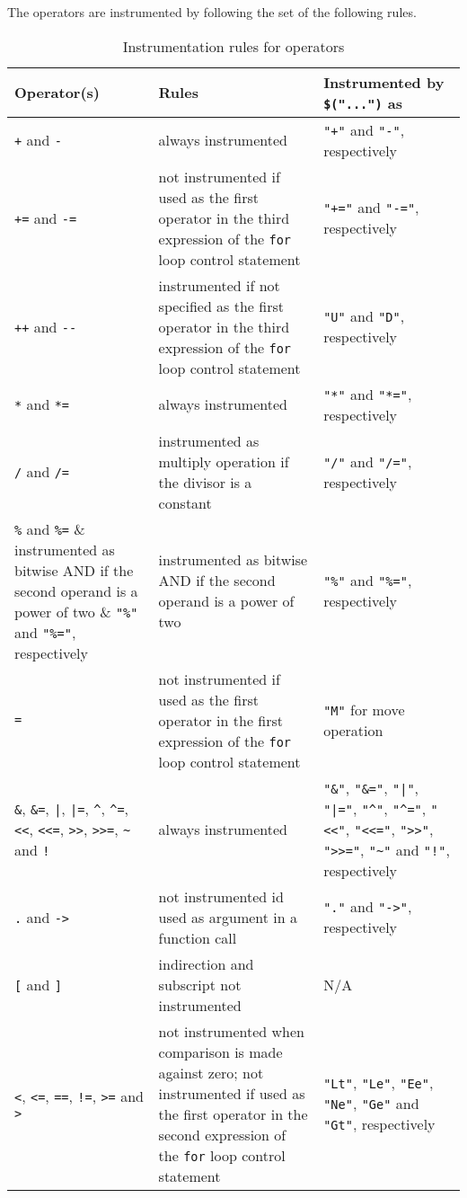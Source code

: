 The operators are instrumented by following the set of the following rules.

\begin{table}[!hb]
\centering\small
\caption{Instrumentation rules for operators}
\begin{tabular}{|p{}<{\raggedright}|p{}<{\raggedright}|p{}<{\raggedright}|}
\hline
\textbf{Operator(s)} & \textbf{Rules} & \textbf{Instrumented by} \verb|$("...")| \textbf{as} \\
\hline
\verb|+| and \verb|-| & always instrumented & \verb|"+"| and \verb|"-"|, respectively \\
\hline
\verb|+=| and \verb|-=| & not instrumented if used as the first operator in the third expression of the \verb|for| loop control statement & \verb|"+="| and \verb|"-="|, respectively \\
\hline
\verb|++| and \verb|--| & instrumented if not specified as the first operator in the third expression of the \verb|for| loop control statement & \verb|"U"| and \verb|"D"|, respectively \\
\hline
\verb|*| and \verb|*=| & always instrumented & \verb|"*"| and \verb|"*="|, respectively \\
\hline
\verb|/| and \verb|/=| & instrumented as multiply operation if the divisor is a constant & \verb|"/"| and \verb|"/="|, respectively \\
\hline
\verb|%| and \verb|%=| & instrumented as bitwise AND if the second operand is a power of two & \verb|"%"| and \verb|"%="|, respectively \\
\hline
\verb|=| & not instrumented if used as the first operator in the first expression of the \verb|for| loop control statement & \verb|"M"| for move operation \\
\hline
\verb|&|, \verb|&=|, \verb$|$, \verb$|=$, \verb|^|, \verb|^=|, \verb|<<|, \verb|<<=|, \verb|>>|, \verb|>>=|, \verb|~| and \verb|!| & always instrumented & \verb|"&"|, \verb|"&="|, \verb$"|"$, \verb$"|="$, \verb|"^"|, \verb|"^="|, \verb|"<<"|, \verb|"<<="|, \verb|">>"|, \verb|">>="|, \verb|"~"| and \verb|"!"|, respectively \\
\hline
\verb|.| and \verb|->| & not instrumented id used as argument in a function call & \verb|"."| and \verb|"->"|, respectively \\
\hline
\verb|[| and \verb|]| & indirection and subscript not instrumented & N/A \\
\hline
\verb|<|, \verb|<=|, \verb|==|, \verb|!=|, \verb|>=| and \verb|>| & not instrumented when comparison is made against zero; not instrumented if used as the first operator in the second expression of the \verb|for| loop control statement & \verb|"Lt"|, \verb|"Le"|, \verb|"Ee"|, \verb|"Ne"|, \verb|"Ge"| and \verb|"Gt"|, respectively \\
\hline
\end{tabular}
\label{tab:instrumentation_rules_operators}
\end{table}

